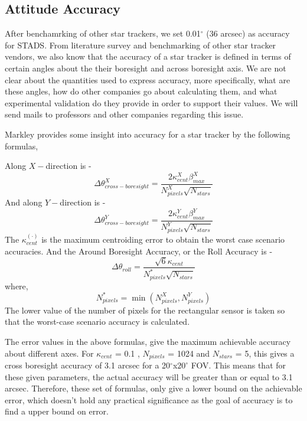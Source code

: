 \documentclass[../../main.tex]{subfiles}
\begin{document}
{{{}

}


\subsection{Attitude Accuracy}
\label{sec:Atti_Accu}
{
After benchamrking of other star trackers, we set 0.01$^\circ$ (36 arcsec) as accuracy for STADS. From literature survey and benchmarking of other star tracker vendors, we also know that the accuracy of a star tracker is defined in terms of certain angles about the their boresight and across boresight axis. We are not clear about the quantities used to express accuracy, more specifically, what are these angles, how do other companies go about calculating them, and what experimental validation do they provide in order to support their values. We will send mails to professors and other companies regarding this issue.

Markley\cite{markley2014fundamentals} provides some insight into accuracy for a star tracker by the following formulas,

Along $X -$direction is -
\begin{equation}
    \Delta \theta_{cross-boresight}^X = \frac{2 \kappa_{cent}^X \beta_{max}^X}{N_{pixels}^X \sqrt{N_{stars}}}
\end{equation}
And along $Y -$direction is -
\begin{equation}
    \Delta \theta_{cross-boresight}^Y = \frac{2 \kappa_{cent}^Y \beta_{max}^Y}{N_{pixels}^Y \sqrt{N_{stars}}}
\end{equation}
The $\kappa_{cent}^{(\cdot)}$ is the maximum centroiding error to obtain the worst case scenario accuracies.
And the Around Boresight Accuracy, or the Roll Accuracy is -
\begin{equation}
    \Delta \theta_{roll} = \frac{\sqrt{6} \kappa_{cent}}{N_{pixels}^* \sqrt{N_{stars}}}
\end{equation}
where,
\begin{equation*}
    N_{pixels}^* = \min\left( N_{pixels}^X, N_{pixels}^Y\right)
\end{equation*}
The lower value of the number of pixels for the rectangular sensor is taken so that the worst-case scenario accuracy is calculated.

The error values in the above formulas, give the maximum achievable accuracy about different axes. For $\kappa_{cent}$ = 0.1 , $N_{pixels}$ = 1024 and $N_{stars}$ = 5, this gives a cross boresight accuracy of 3.1 arcsec for a 20$^\circ$x$20^\circ$ FOV. This means that for these given parameters, the actual accuracy will be greater than or equal to 3.1 arcsec.
Therefore, these set of formulas, only give a lower bound on the achievable error, which doesn't hold any practical significance as the goal of accuracy is to find a upper bound on error. 

}}
\end{document}
